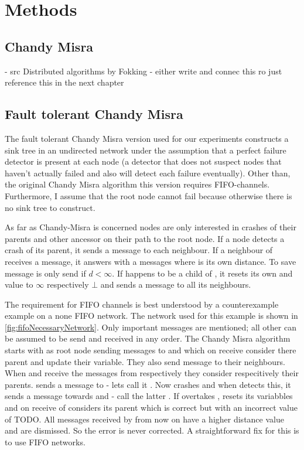 \section{Methods}  %
\label{sec:methods}
\subsection{Chandy Misra}
 - src Distributed algorithms by Fokking
 - either write and connec this ro just reference this in the next chapter
\subsection {Fault tolerant Chandy Misra}
\label{ssec:fault-tolerant-chandy-misra}
  The fault tolerant Chandy Misra version used for our experiments constructs a sink tree in an undirected network under the assumption that a perfect failure detector is present at each node (a detector that does not suspect nodes that haven't actually failed and also will detect each failure eventually). 
  Other than, the original Chandy Misra algorithm this version requires FIFO-channels.
  Furthermore, I assume that the root node cannot fail because otherwise there is no sink tree to construct.
  
  As far as Chandy-Misra is concerned nodes are only interested in crashes of their parents and other ancessor on their path to the root node.
  If a node  detects a crash of its parent, it sends a  message to each neighbour. 
  If a neighbour  of  receives a  message, it answers with a  messages where  is its own distance. 
  To save message  is only send if $d < \infty $.
  If  happens to be a child of , it resets its own  and  value to $\infty$ respectively $\bot$ and sends a  message to all its neighbours.
  
  The requirement for FIFO channels is best understood by a counterexample example on a none FIFO network.
  The network used for this example is shown in \cref{fig:fifoNecessaryNetwork}. 
  Only important messages are mentioned; all other can be assumed to be send and received in any order.
  The Chandy Misra algorithm starts with  as root node sending  messages to  and  which on receive consider  there parent and update their  variable.
  They also send  message to their neighbours. 
  When  and  receive the  messages from  respectively  they consider  respecitively  their parents.
   sends a  message to  - lets call it .
  Now  crashes and when  detects this, it sends a  message towards  and  - call the latter .
  If  overtakes ,  resets its variabbles and on receive of  considers  its parent which is correct but with an incorrect  value of TODO.
  All  messages received by  from now on have a higher distance value and are dismissed. 
  So the error is never corrected.
  A straightforward fix for this is to use FIFO networks.
  
